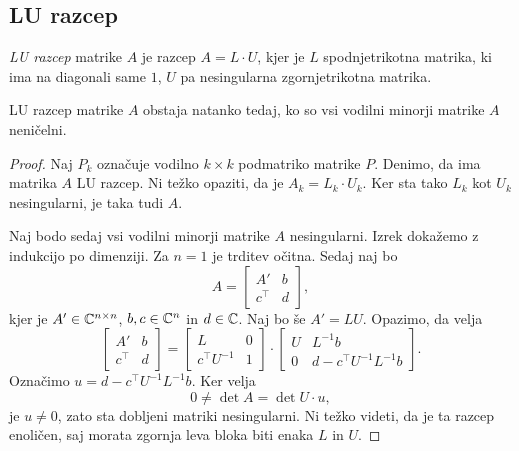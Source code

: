 \newpage

\subsection{LU razcep}

\begin{definicija}
\emph{LU razcep} matrike $A$ je razcep
$A = L \cdot U$, kjer je $L$ spodnjetrikotna matrika, ki ima na
diagonali same $1$, $U$ pa nesingularna zgornjetrikotna matrika.
\end{definicija}

\begin{izrek}
LU razcep matrike $A$ obstaja natanko tedaj, ko so vsi vodilni
minorji matrike $A$ neničelni.
\end{izrek}

\begin{proof}
Naj $P_k$ označuje vodilno $k \times k$ podmatriko matrike $P$.
Denimo, da ima matrika $A$ LU razcep. Ni težko opaziti, da je
$A_k = L_k \cdot U_k$. Ker sta tako $L_k$ kot $U_k$ nesingularni,
je taka tudi $A$.

Naj bodo sedaj vsi vodilni minorji matrike $A$ nesingularni. Izrek
dokažemo z indukcijo po dimenziji. Za $n=1$ je trditev očitna.
Sedaj naj bo
\[
A =
\begin{bmatrix}
  A'   & b \\
c^\top & d
\end{bmatrix},
\]
kjer je $A' \in \mathbb{C}^{n \times n}$, $b, c \in \mathbb{C}^n$ in $d \in \mathbb{C}$.
Naj bo še $A' = LU$. Opazimo, da velja
\[
\begin{bmatrix}
  A'   & b \\
c^\top & d
\end{bmatrix}
=
\begin{bmatrix}
       L      & 0 \\
c^\top U^{-1} & 1
\end{bmatrix}
\cdot
\begin{bmatrix}
U & L^{-1} b                   \\
0 & d - c^\top U^{-1} L^{-1} b
\end{bmatrix}.
\]
Označimo $u = d - c^\top U^{-1} L^{-1} b$. Ker velja
\[
0 \ne \det A = \det U \cdot u,
\]
je $u \ne 0$, zato sta dobljeni matriki nesingularni. Ni težko
videti, da je ta razcep enoličen, saj morata zgornja leva bloka
biti enaka $L$ in $U$.
\end{proof}

